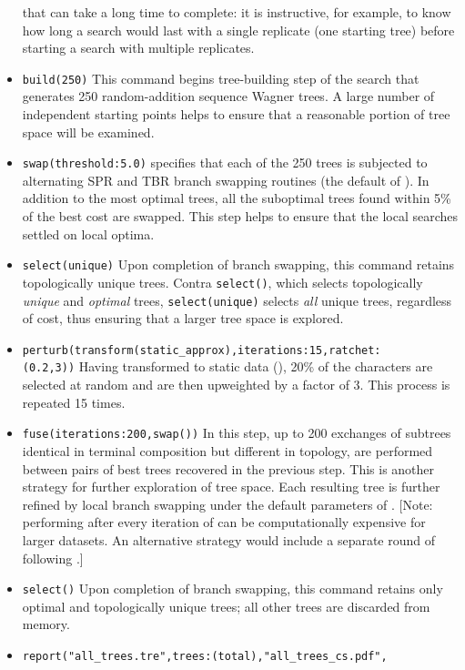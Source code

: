 \begin{itemize}
that can take a long time to complete: it is instructive, for
example, to know how long a search would last with a single replicate
(one starting tree) before starting a search with multiple replicates.
\item \texttt{build(250)} This command begins tree-building step
of the search that generates 250 random-addition sequence Wagner
trees. A large number of independent starting points helps to ensure that
a reasonable portion of tree space will be examined.  
\item \texttt{swap(threshold:5.0)}  specifies that each
of the 250 trees is subjected to alternating SPR and TBR branch
swapping routines (the default of \poy).  In addition to the most
optimal trees, all the suboptimal trees found within 5\% of the
best cost are swapped. This step helps to ensure that the local searches 
settled on local  optima.
\item \texttt{select(unique)} Upon completion of branch swapping,
this command retains topologically unique trees.  Contra
\texttt{select()}, which selects topologically \emph{unique} and
\emph{optimal} trees,  \texttt{select(unique)} selects \emph{all}
unique trees, regardless of cost, thus ensuring that a larger tree
space is explored.  
\item \texttt{perturb(transform(static\_approx),iterations:15,ratchet:\\(0.2,3))}
Having transformed to static data (),
20\% of the characters are selected at random and are then upweighted
by a factor of $3$.  This process is repeated 15 times.  
\item \texttt{fuse(iterations:200,swap())} In this step, up to 200 exchanges
of subtrees identical in terminal composition but different in
topology, are performed between pairs of best trees recovered in
the previous step. This is another strategy for further exploration
of tree space. Each resulting tree is further refined by local
branch swapping under the default parameters of .
[Note: performing  after every iteration of
 can be computationally expensive for larger
datasets. An alternative strategy would include
a separate round of  following .]
\item \texttt{select()} Upon completion of branch swapping, this
command retains only optimal and topologically unique trees; all
other trees are discarded from memory.  
\item \texttt{report("all\_trees.tre",trees:(total),"all\_trees\_cs.pdf",\\
}
\end{itemize}
